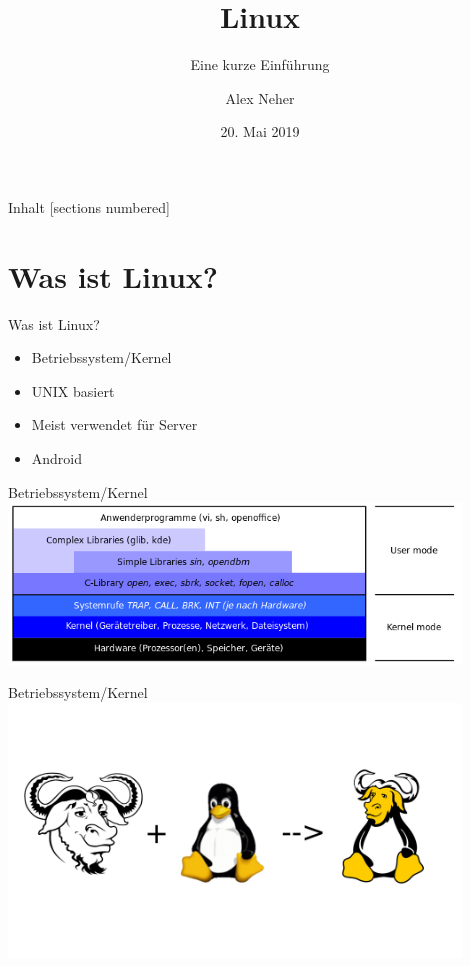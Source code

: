 \documentclass[10pt]{beamer}
\title{Linux}
\subtitle{Eine kurze Einführung}
\date{20. Mai 2019}
\author{Alex Neher}
\begin{document}
\pagestyle{empty}
	
\begin{frame}

\end{frame}

\maketitle

\begin{frame}{Inhalt}
  [sections numbered]
  \tableofcontents[hideallsubsections]
\end{frame}

\section{Was ist Linux?}

\begin{frame}{Was ist Linux?}
    \begin{itemize}[<+- | alert@+>]
        \item Betriebssystem/Kernel
        \item UNIX basiert
        \item Meist verwendet für Server
        \item Android
    \end{itemize}

\end{frame}

\begin{frame}{Betriebssystem/Kernel}
    \centering
    \includegraphics[keepaspectratio,width=0.9\textwidth]{img/kernel_schichten.png}
\end{frame}

\begin{frame}{Betriebssystem/Kernel}
\centering
\includegraphics[keepaspectratio,width=0.9\textwidth]{img/gnupluslinux.png}
\end{frame}
\end{document}
